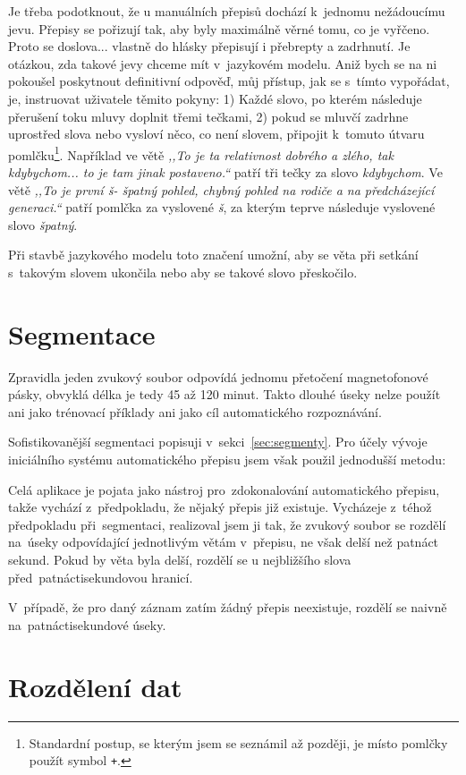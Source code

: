 Je třeba podotknout, že u manuálních přepisů dochází k~jednomu
nežádoucímu jevu. Přepisy se pořizují tak, aby byly maximálně věrné tomu, co je
vyřčeno. Proto se doslova... vlastně do hlásky přepisují i přebrepty a zadrhnutí.
Je otázkou, zda takové jevy chceme mít v~jazykovém modelu. Aniž bych se na ni
pokoušel poskytnout definitivní odpověď, můj přístup, jak se s~tímto vypořádat,
je, instruovat uživatele těmito pokyny: 1) Každé slovo, po kterém následuje přerušení toku
mluvy doplnit třemi tečkami,
2) pokud se mluvčí zadrhne uprostřed slova nebo vysloví něco, co není slovem,
připojit k~tomuto útvaru pomlčku\footnote{Standardní postup, se kterým jsem se
seznámil až později, je místo pomlčky použít symbol \texttt{+}.}. Například ve větě {\em ,,To je ta relativnost
dobrého a zlého, tak kdybychom... to je tam jinak postaveno.``} patří tři tečky
za slovo {\em kdybychom}. Ve větě {\em ,,To je první š- špatný pohled, chybný pohled na rodiče a na
předcházející generaci.``} patří pomlčka za vyslovené {\em š}, za kterým
teprve následuje vyslovené slovo {\em špatný}.

Při stavbě jazykového modelu toto značení umožní, aby se věta při setkání
s~takovým slovem ukončila nebo aby se takové slovo přeskočilo.


\section{Segmentace}

Zpravidla jeden zvukový soubor odpovídá jednomu přetočení magnetofonové pásky,
obvyklá délka je tedy 45 až 120 minut. Takto dlouhé úseky nelze použít ani jako
trénovací příklady ani jako cíl automatického rozpoznávání.

Sofistikovanější segmentaci popisuji v~sekci~\ref{sec:segmenty}. Pro účely
vývoje iniciálního systému automatického přepisu jsem však použil jednodušší
metodu:

Celá aplikace je pojata jako nástroj pro~zdokonalování automatického přepisu,
takže vychází z~předpokladu, že nějaký přepis již existuje. Vycházeje z~téhož
předpokladu při~segmentaci, realizoval jsem ji tak, že zvukový soubor se rozdělí
na~úseky odpovídající jednotlivým větám v~přepisu, ne však delší než patnáct
sekund. Pokud by věta byla delší, rozdělí se u nejbližšího slova
před~patnáctisekundovou hranicí.

V~případě, že pro daný záznam zatím žádný přepis neexistuje, rozdělí se naivně
na~patnáctisekundové úseky.

\section{Rozdělení dat}
\label{sec:asr:rozdeleni-dat}

